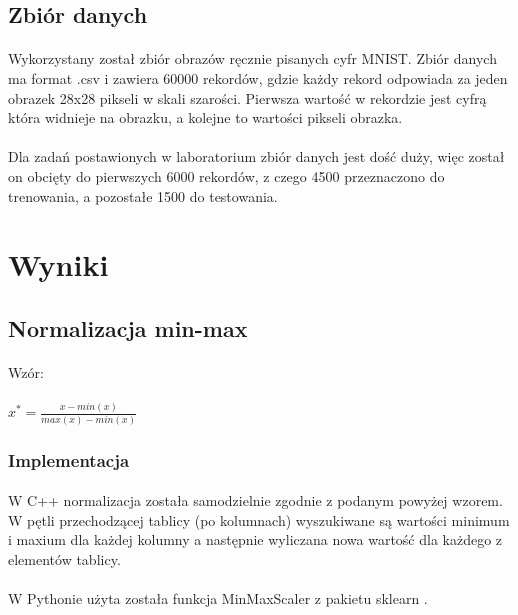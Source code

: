 \documentclass[a4paper,11pt]{article}
\begin{document}
\subsection{Zbiór danych} 
\paragraph{}Wykorzystany został zbiór obrazów ręcznie pisanych cyfr MNIST. Zbiór danych ma format .csv i zawiera 60000 rekordów, gdzie każdy rekord odpowiada za jeden obrazek 28x28 pikseli w skali szarości. Pierwsza wartość w rekordzie jest cyfrą która widnieje na obrazku, a kolejne to wartości pikseli obrazka. 
\paragraph{}
Dla zadań postawionych w laboratorium zbiór danych jest dość duży, więc został on obcięty do pierwszych 6000 rekordów, z czego 4500 przeznaczono do trenowania, a pozostałe 1500 do testowania.
\newpage    
\section{Wyniki}   
\subsection{Normalizacja min-max} 
\paragraph{}Wzór:
\paragraph{}$x^*=\frac{x-min(x)}{max(x)-min(x)}$
\subsubsection{Implementacja} 
\paragraph{}W C++ normalizacja została samodzielnie zgodnie z podanym powyżej wzorem. W pętli przechodzącej tablicy (po kolumnach) wyszukiwane są wartości minimum i maxium dla każdej kolumny a następnie wyliczana nowa wartość dla każdego z elementów tablicy.

\paragraph{}W Pythonie użyta została funkcja MinMaxScaler z pakietu sklearn .
\end{document}
